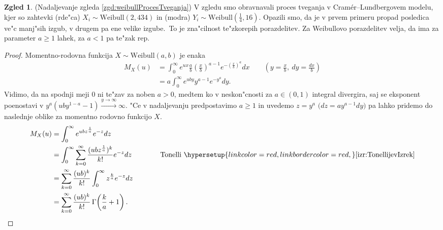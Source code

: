 \documentclass[12pt, a4paper, reqno]{amsart}
\theoremstyle{definition}
\newtheorem{zgled}[definicija]{Zgled}
\theoremstyle{plain}
\newcommand{\1}{\mathds{1}}
\newcommand*{\refPriloga}[1]{%
  \begingroup
    \hypersetup{
      linkcolor=red,
      linkbordercolor=red,
    }%
    \ref{#1}%
  \endgroup
}
\begin{document}
        \begin{zgled}(Nadaljevanje zgleda \ref{zgd:weibullProcesTveganja})
            V zgledu smo obravnavali proces tveganja v Cramér--Lundbergovem 
            modelu, kjer so zahtevki (rde"ca) $X_i\sim\text{Weibull}(2, 434)$ in (modra) 
            $Y_i\sim\text{Weibull}(\tfrac{1}{4}, 16)$. Opazili smo, da je v prvem primeru propad
            posledica ve"c manj"sih izgub, v drugem pa ene velike izgube.\ To je zna"cilnost te"zkorepih
            porazdelitev. Za Weibullovo porazdelitev velja, da ima za parameter
            $a \geq 1$ lahek, za $a<1$ pa te"zak rep.
            \begin{proof}
                Momentno-rodovna funkcija $X\sim\text{Weibull}(a, b)$ je enaka
                \begin{align*}
                    M_X(u) &= \int_{0}^{\infty}e^{ux}\frac{a}{b}\left(\frac{x}{b}\right)^{a-1}e^{-\left(\frac{x}{b}\right)^a}dx \qquad \left(y = \tfrac{x}{b},\ dy = \tfrac{dx}{b}\right) \\
                           &= a\int_{0}^{\infty}e^{uby} y^{a-1}e^{-y^a}dy.
                \end{align*}
                Vidimo, da na spodnji meji $0$ ni te"zav za noben $a > 0$, medtem ko v neskon"cnosti 
                za $a\in(0, 1)$ integral divergira, saj se 
                eksponent poenostavi v $y^a(uby^{1 - a} - 1)\xrightarrow{y\to\infty}\infty$. "Ce v 
                nadaljevanju predpostavimo $a\geq 1$ in uvedemo $z = y^a$ 
                $\bigl(dz = ay^{a-1}dy\bigr)$ pa lahko pridemo do naslednje oblike 
                za momentno rodovno funkcijo $X$. \phantom{\qedhere}
                \begin{align*}
                    M_X(u) &= \int_{0}^{\infty}e^{ubz^{\frac{1}{a}}}e^{-z}dz \\
                           &= \int_{0}^{\infty}\sum_{k=0}^{\infty}\frac{(ubz^{\frac{1}{a}})^k}{k!}e^{-z}dz \qquad \qquad \text{Tonelli} \ \refPriloga{izr:TonellijevIzrek} \\
                           &= \sum_{k=0}^{\infty}\frac{(ub)^k}{k!}\int_{0}^{\infty}z^{\frac{k}{a}}e^{-z}dz \\
                           &= \sum_{k=0}^{\infty}\frac{(ub)^k}{k!} \, \Gamma \! \left(\frac{k}{a} + 1\right).
                \end{align*} 
            \end{proof}
            \label{zgd:weibullLahkorepnaPorazdelitev}
        \end{zgled}
\end{document}
